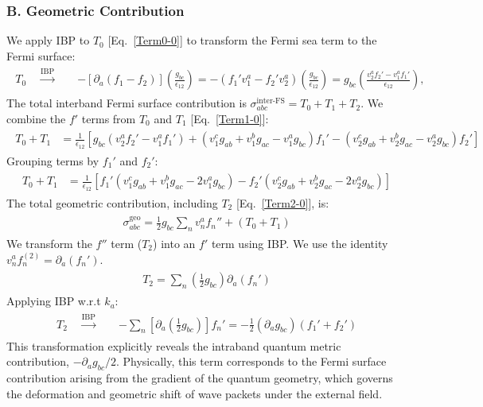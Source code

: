 \documentclass[twocolumn, prx, reprint, amsfonts, amsmath, amssymb, longbibliography, floatfix, aps]{revtex4-2}
\begin{document}
\subsubsection*{B. Geometric Contribution}
We apply IBP to $T_0$ [Eq.~\eqref{Term0-0}] to transform the Fermi sea term to the Fermi surface:
\begin{align}
\begin{aligned}
T_0 \quad \xrightarrow{\text{IBP}} \quad & - \left[ \partial_a (f_1 - f_2) \right] \left( \frac{g_{bc}}{\epsilon_{12}} \right) = - (f_1' v_1^a - f_2' v_2^a) \left( \frac{g_{bc}}{\epsilon_{12}} \right) = g_{bc} \left( \frac{v_2^a f_2' - v_1^a f_1'}{\epsilon_{12}} \right),
\end{aligned}
\end{align}
The total interband Fermi surface contribution is $\sigma_{abc}^{\text{inter-FS}} = T_0 + T_1 + T_2$.
We combine the $f'$ terms from $T_0$ and $T_1$ [Eq.~\eqref{Term1-0}]:
\begin{align}
\begin{aligned}
T_0 + T_1 &= \frac{1}{\epsilon_{12}} \left[ g_{bc}(v_2^a f_2' - v_1^a f_1') + (v_1^c g_{ab} + v_1^b g_{ac} - v_1^a g_{bc}) f_1' - (v_2^c g_{ab} + v_2^b g_{ac} - v_2^a g_{bc}) f_2' \right]
\label{Term0+Term1-0}
\end{aligned}
\end{align}
Grouping terms by $f_1'$ and $f_2'$:
\begin{align}
\begin{aligned}
T_0 + T_1 &= \frac{1}{\epsilon_{12}} \left[ f_1' (v_1^c g_{ab} + v_1^b g_{ac} - 2v_1^a g_{bc}) - f_2' (v_2^c g_{ab} + v_2^b g_{ac} - 2v_2^a g_{bc}) \right]
\end{aligned}
\end{align}
The total geometric contribution, including $T_2$ [Eq.~\eqref{Term2-0}], is:
\begin{align}
\begin{aligned}
\sigma_{abc}^{\text{geo}} = \frac{1}{2} g_{bc} \sum_n v_n^a f_n'' + (T_0+T_1) 
\end{aligned}
\end{align}
We transform the $f''$ term ($T_2$) into an $f'$ term using IBP. We use the identity $v_n^a f_n^{(2)} = \partial_a(f_n')$.
\begin{align}
\begin{aligned}
T_2 = \sum_n (\frac{1}{2} g_{bc}) \partial_a(f_n')
\end{aligned}
\end{align}
Applying IBP w.r.t $k_a$:
\begin{align}
\begin{aligned}
T_2 \quad \xrightarrow{\text{IBP}} \quad & - \sum_n \left[ \partial_a (\frac{1}{2} g_{bc}) \right] f_n' = -\frac{1}{2} (\partial_a g_{bc}) (f_1' + f_2')
\end{aligned}
\end{align}
This transformation explicitly reveals the intraband quantum metric contribution, $-\partial_a g_{b c}/2$. Physically, this term corresponds to the Fermi surface contribution arising from the gradient of the quantum geometry, which governs the deformation and geometric shift of wave packets under the external field.
\end{document}
